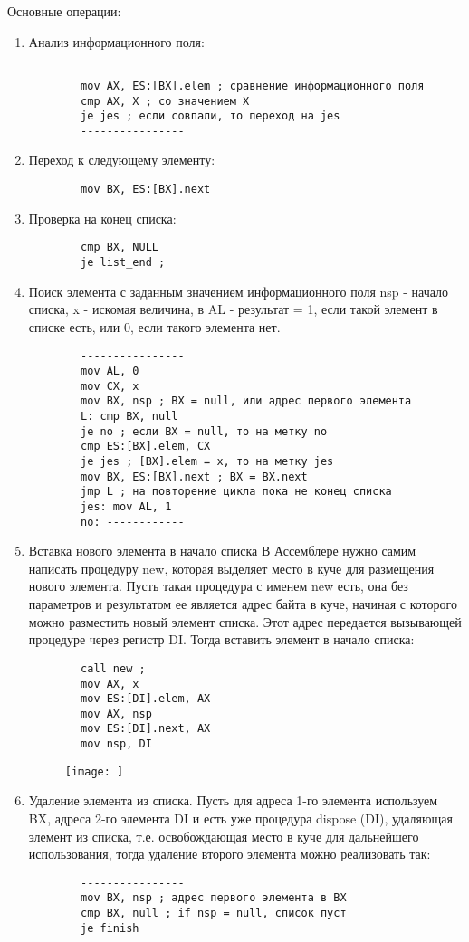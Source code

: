 Основные операции:
\begin{enumerate}
    \item Анализ информационного поля:
    \begin{verbatim}
        ----------------
        mov AX, ES:[BX].elem ; сравнение информационного поля
        cmp AX, X ; со значением X
        je jes ; если совпали, то переход на jes
        ----------------
    \end{verbatim}
    \item Переход к следующему элементу:
    \begin{verbatim}
        mov BX, ES:[BX].next
    \end{verbatim}
    \item Проверка на конец списка:
    \begin{verbatim}
        cmp BX, NULL
        je list_end ;
    \end{verbatim}
    \item Поиск элемента с заданным значением информационного поля
    nsp - начало списка, x - искомая величина, в AL - результат = 1, если такой элемент в списке есть, или 0, если такого элемента нет.
    \begin{verbatim}
        ----------------
        mov AL, 0
        mov CX, x
        mov BX, nsp ; BX = null, или адрес первого элемента
        L: cmp BX, null
        je no ; если BX = null, то на метку no
        cmp ES:[BX].elem, CX
        je jes ; [BX].elem = x, то на метку jes
        mov BX, ES:[BX].next ; BX = BX.next
        jmp L ; на повторение цикла пока не конец списка
        jes: mov AL, 1
        no: ------------
    \end{verbatim}
    \item Вставка нового элемента в начало списка
    В Ассемблере нужно самим написать процедуру new, которая выделяет место в куче для размещения нового элемента. Пусть такая процедура с именем new есть, она без параметров и результатом ее является адрес байта в куче,
    начиная с которого можно разместить новый элемент списка. Этот адрес передается вызывающей процедуре через регистр DI. Тогда вставить элемент в начало списка:
    \begin{verbatim}
        call new ;
        mov AX, x
        mov ES:[DI].elem, AX
        mov AX, nsp
        mov ES:[DI].next, AX
        mov nsp, DI
    \end{verbatim}
    \begin{figure}[H]
        \texttt{[image: ]}
    \end{figure}
    \item Удаление элемента из списка.
    Пусть для адреса 1-го элемента используем BX, адреса 2-го элемента DI и есть уже процедура dispose (DI), удаляющая элемент из списка, т.е. освобождающая место в куче для дальнейшего использования, тогда удаление второго элемента можно реализовать так:
    \begin{verbatim}
        ----------------
        mov BX, nsp ; адрес первого элемента в BX
        cmp BX, null ; if nsp = null, список пуст
        je finish


\end{verbatim}
\end{enumerate}

